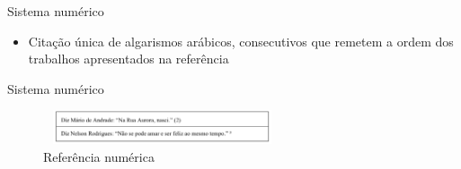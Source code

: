 \begin{frame}	
	\begin{block}{Sistema numérico}	
		\begin{itemize}
			\item Citação única de algarismos arábicos, consecutivos que remetem a ordem dos trabalhos apresentados na referência
		\end{itemize}
	\end{block}
\end{frame}

\begin{frame}	
	\begin{block}{Sistema numérico}	
		 \begin{figure}[!htb]
			\centering	  				
			\includegraphics[height=1cm, width = 7cm]{./pic/numerico.png}
			\caption{Referência numérica}
			\author{Guia de formatação SENAC }
			\label{fig_citacaodecitacao}
		\end{figure}
	\end{block}
\end{frame}